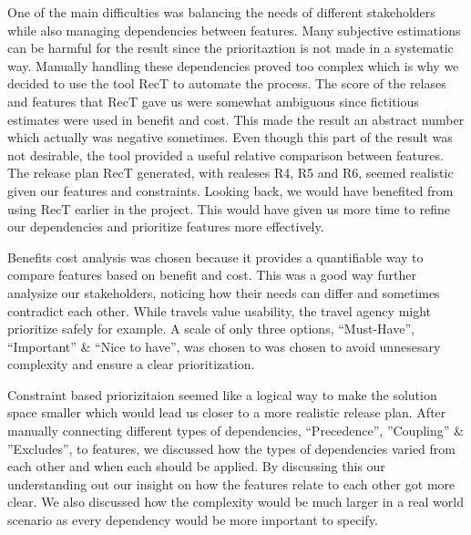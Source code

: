 One of the main difficulties was balancing the needs of different stakeholders while also managing dependencies between features. Many subjective estimations can be harmful for the result since the prioritaztion is not made in a systematic way. Manually handling these dependencies proved too complex which is why  we decided to use the tool RecT to automate the process. The score of the relases and features that RecT gave us were somewhat ambiguous since fictitious estimates were used in benefit and cost. This made the result an abstract number which actually was negative sometimes. Even though this part of the result was not desirable, the tool provided a useful relative comparison between features. The release plan RecT generated, with realeses R4, R5 and R6, seemed realistic given our features and constraints. Looking back, we would have benefited from using RecT earlier in the project. This would have given us more time to refine our dependencies and prioritize features more effectively. 

Benefits cost analysis was chosen because it provides a quantifiable way to compare features based on benefit and cost. This was a good way further analysize our stakeholders, noticing how their needs can differ and sometimes contradict each other. While travels value usability, the travel agency might prioritize safely for example. A scale of only three options, “Must-Have”, “Important” \& “Nice to have”, was chosen to was chosen to avoid unnesesary complexity and ensure a clear prioritization.

Constraint based priorizitaion seemed like a logical way to make the solution space smaller which would lead us closer to a more realistic release plan. After manually connecting different types of dependencies, “Precedence”, ”Coupling” \& ”Excludes”, to features, we discussed how the types of dependencies varied from each other and when each should be applied. By discussing this our understanding out our insight on how the features relate to each other got more clear. We also discussed how the complexity would be much larger in a real world scenario as every dependency would be more important to specify. 
